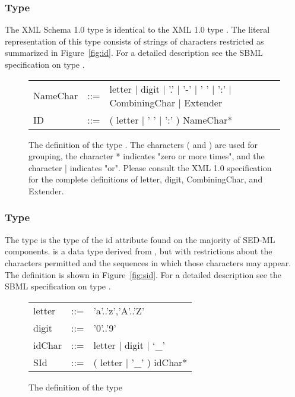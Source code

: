 \subsubsection[\element{ID}]{Type }
\label{type:id}
The XML Schema 1.0 type  is identical to the XML 1.0 type . The literal representation of this type consists of strings of characters restricted as summarized in Figure~\vref{fig:id}. For a detailed description see the SBML specification on type  \citep{HBH+10}.

\begin{figure}[hbt]
  \ttfamily
  \small
  \centering
  \begin{tabular}{lll}
    NameChar & ::= & letter | digit | '.' | '-' | ' ' | ':' | CombiningChar | Extender\\
    ID    & ::= & ( letter | ' ' | ':' ) NameChar*\\
  \end{tabular}
  \vspace*{-1ex}
  \caption{The definition of the type . The characters ( and ) are used for grouping, the character * indicates "zero or more times", and the character | indicates "or". Please consult the XML 1.0 specification for the complete definitions of letter, digit, CombiningChar, and Extender.}
  \label{fig:id}
\end{figure}

\subsubsection[\element{SId}]{Type }
\label{type:sid}
The type  is the type of the id attribute found on the majority of SED-ML components.  is a data type derived from , but with restrictions about the characters permitted and the sequences in which those characters may appear. The definition is shown in Figure~\vref{fig:sid}. For a detailed description see the SBML specification on type  \citep{HBH+10}.

\begin{figure}[hbt]
  \ttfamily
  \small
  \centering
  \begin{tabular}{lll}
    letter & ::= & 'a'..'z','A'..'Z'\\
    digit  & ::= & '0'..'9'\\
    idChar & ::= & letter | digit | `\_'\\
    SId    & ::= & ( letter | '\_' ) idChar*\\
  \end{tabular}
  \vspace*{-1ex}
  \caption{The definition of the type }
  \label{fig:sid}
\end{figure}

